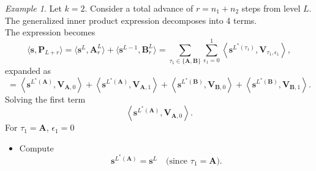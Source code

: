 \documentclass[11pt]{article}
\theoremstyle{definition}
\theoremstyle{remark}
\newtheorem{ex}[thm]{Example}
\numberwithin{equation}{section}
\begin{document}
\begin{ex}

Let \( k = 2 \). Consider a total advance of \( r = n_1 + n_2 \) steps from level \( L \). The generalized inner product expression decomposes into 4 terms. \\

The expression becomes
\[
\langle \mathbf{s}, \mathbf{P}_{L+r} \rangle=\langle \mathbf{s}^L, \mathbf{A}_r^L \rangle + \langle \mathbf{s}^{L-1}, \mathbf{B}_r^L \rangle = \sum_{\tau_1 \in \{\mathbf{A},\mathbf{B}\}} \sum_{\epsilon_1=0}^{1} \left\langle \mathbf{s}^{L^*(\tau_1)}, \mathbf{V}_{\tau_1, \epsilon_1} \right\rangle,
\]
expanded as
\[
= \left\langle \mathbf{s}^{L^*(\mathbf{A})}, \mathbf{V}_{\mathbf{A}, 0} \right\rangle + \left\langle \mathbf{s}^{L^*(\mathbf{A})}, \mathbf{V}_{\mathbf{A}, 1} \right\rangle + \left\langle \mathbf{s}^{L^*(\mathbf{B})}, \mathbf{V}_{\mathbf{B}, 0} \right\rangle + \left\langle \mathbf{s}^{L^*(\mathbf{B})}, \mathbf{V}_{\mathbf{B}, 1} \right\rangle.
\]
Solving the first term
\[
\left\langle \mathbf{s}^{L^*(\mathbf{A})}, \mathbf{V}_{\mathbf{A}, 0} \right\rangle .
\]
For \( \tau_1 = \mathbf{A} \), \( \epsilon_1 = 0 \)
\begin{itemize}
    \item Compute
    $$\mathbf{s}^{L^*(\mathbf{A})} = \mathbf{s}^L \quad \text{(since $\tau_1 = \mathbf{A}$)}.$$
    

\end{itemize}
\end{ex}
\end{document}
